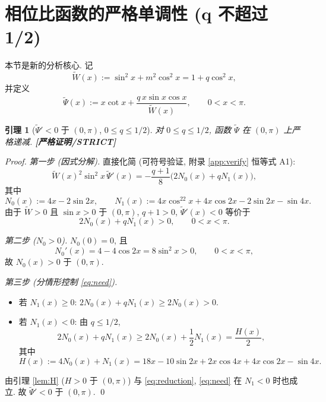 \documentclass[UTF8]{ctexart}
\newtheorem{lemma}[theorem]{引理}
\newcommand{\STRICT}{\textbf{[严格证明/STRICT]}}
\begin{document}
\section{相位比函数的严格单调性 (q 不超过 1/2)}\label{sec:mono}

本节是新的分析核心. 记
\begin{equation}
	\widetilde W(x):=\sin^2x+m^2\cos^2x=1+q\cos^2x,
\end{equation}
并定义
\begin{equation}
	\widetilde\Psi(x):=x\cot x+\frac{q\,x\sin x\cos x}{\widetilde W(x)},
	\qquad 0<x<\pi.
	\label{eq:psitilde}
\end{equation}

\begin{lemma}[$\widetilde\Psi'<0$ 于 $(0,\pi)$, $0\le q\le1/2$]\label{lem:psiprime}
	对 $0\le q\le 1/2$, 函数 $\widetilde\Psi$ 在 $(0,\pi)$ 上严格递减.
	\STRICT{}
\end{lemma}

\begin{proof}
	\emph{第一步 (因式分解).} 直接化简 (可符号验证, 附录 \ref{app:verify} 恒等式 A1):
	\begin{equation}
		\widetilde W(x)^2\sin^2x\,\widetilde\Psi'(x)
		=-\frac{q+1}{8}\bigl(2N_0(x)+qN_1(x)\bigr),
		\label{eq:factor}
	\end{equation}
	其中
	\begin{equation}
		N_0(x):=4x-2\sin2x,\qquad
		N_1(x):=4x\cos^22x+4x\cos2x-2\sin2x-\sin4x.
	\end{equation}
	由于 $\widetilde W>0$ 且 $\sin x>0$ 于 $(0,\pi)$, $q+1>0$,
	$\widetilde\Psi'(x)<0$ 等价于
	\begin{equation}
		2N_0(x)+qN_1(x)>0,\qquad 0<x<\pi.
		\label{eq:need}
	\end{equation}

	\emph{第二步 ($N_0>0$).} $N_0(0)=0$, 且
	\begin{equation}
		N_0'(x)=4-4\cos2x=8\sin^2x>0,\qquad 0<x<\pi,
	\end{equation}
	故 $N_0(x)>0$ 于 $(0,\pi)$.

	\emph{第三步 (分情形控制 \eqref{eq:need}).}
	\begin{itemize}
		\item 若 $N_1(x)\ge0$: $2N_0(x)+qN_1(x)\ge 2N_0(x)>0$. \checkmark
		\item 若 $N_1(x)<0$: 由 $q\le 1/2$,
			\begin{equation}
				2N_0(x)+qN_1(x)\ge 2N_0(x)+\frac12N_1(x)
				=\frac{H(x)}2,
				\label{eq:reduction}
			\end{equation}
			其中
			\begin{equation}
				H(x):=4N_0(x)+N_1(x)
				=18x-10\sin2x+2x\cos4x+4x\cos2x-\sin4x.
				\label{eq:H}
			\end{equation}
	\end{itemize}
	由引理 \ref{lem:H} ($H>0$ 于 $(0,\pi)$) 与 \eqref{eq:reduction},
	\eqref{eq:need} 在 $N_1<0$ 时也成立. 故 $\widetilde\Psi'<0$ 于 $(0,\pi)$. \qed
\end{proof}
\end{document}
